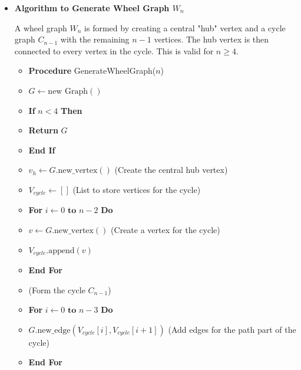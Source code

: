 \documentclass{article}
\begin{document}
\begin{itemize}
    \item \textbf{Algorithm to Generate Wheel Graph $W_n$}
    
    A wheel graph $W_n$ is formed by creating a central "hub" vertex and a cycle graph $C_{n-1}$ with the remaining $n-1$ vertices. The hub vertex is then connected to every vertex in the cycle. This is valid for $n \ge 4$.
    
    \begin{itemize}
        \item \textbf{Procedure} GenerateWheelGraph($n$)
        \item \hspace{0.5cm} $G \gets \text{new Graph}()$
        \item \hspace{0.5cm} \textbf{If} $n < 4$ \textbf{Then}
        \item \hspace{1cm} \textbf{Return} $G$
        \item \hspace{0.5cm} \textbf{End If}
        \item \hspace{0.5cm} $v_h \gets G.\text{new\_vertex}()$ (Create the central hub vertex)
        \item \hspace{0.5cm} $V_{cycle} \gets []$ (List to store vertices for the cycle)
        \item \hspace{0.5cm} \textbf{For} $i \gets 0 \textbf{ to } n-2$ \textbf{Do}
        \item \hspace{1cm} $v \gets G.\text{new\_vertex}()$ (Create a vertex for the cycle)
        \item \hspace{1cm} $V_{cycle}.\text{append}(v)$
        \item \hspace{0.5cm} \textbf{End For}
        \item \hspace{0.5cm} (Form the cycle $C_{n-1}$)
        \item \hspace{0.5cm} \textbf{For} $i \gets 0 \textbf{ to } n-3$ \textbf{Do}
        \item \hspace{1cm} $G.\text{new\_edge}(V_{cycle}[i], V_{cycle}[i+1])$ (Add edges for the path part of the cycle)
        \item \hspace{0.5cm} \textbf{End For}

\end{itemize}
\end{itemize}
\end{document}
